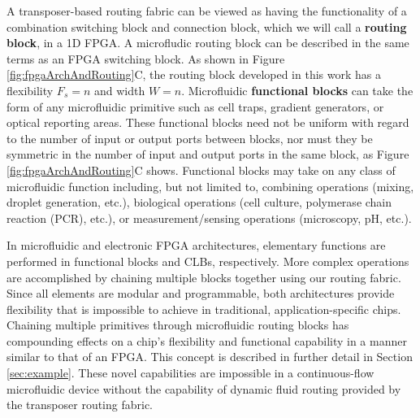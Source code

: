 A transposer-based routing fabric can be viewed as having the functionality of a combination switching block and connection block, which we will call a \textbf{routing block}, in a 1D FPGA. A microfludic routing block can be described in the same terms as an FPGA switching block. As shown in Figure \ref{fig:fpgaArchAndRouting}C, the routing block developed in this work has a flexibility $F_s=n$ and width $W=n$. Microfluidic \textbf{functional blocks} can take the form of any microfluidic primitive such as cell traps, gradient generators, or optical reporting areas. These functional blocks need not be uniform with regard to the number of input or output ports between blocks, nor must they be symmetric in the number of input and output ports in the same block, as Figure \ref{fig:fpgaArchAndRouting}C shows. Functional blocks may take on any class of microfluidic function including, but not limited to, combining operations (mixing, droplet generation, etc.), biological operations (cell culture, polymerase chain reaction (PCR), etc.), or measurement/sensing operations (microscopy, pH, etc.). 

In microfluidic and electronic FPGA architectures, elementary functions are performed in functional blocks and CLBs, respectively. More complex operations are accomplished by chaining multiple blocks together using our routing fabric. Since all elements are modular and programmable, both architectures provide flexibility that is impossible to achieve in traditional, application-specific chips.  Chaining multiple primitives through microfluidic routing blocks has compounding effects on a chip's flexibility and functional capability in a manner similar to that of an FPGA. This concept is described in further detail in Section \ref{sec:example}. These novel capabilities are impossible in a continuous-flow microfluidic device without the capability of dynamic fluid routing provided by the transposer routing fabric.


